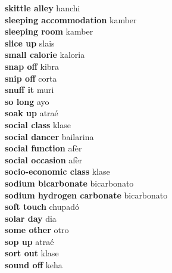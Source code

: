 \textbf{ skittle alley  } hanchi \\
\textbf{ sleeping accommodation  } kamber \\
\textbf{ sleeping room  } kamber \\
\textbf{ slice up  } slais \\
\textbf{ small calorie  } kaloria \\
\textbf{ snap off  } kibra \\
\textbf{ snip off  } corta \\
\textbf{ snuff it  } muri \\
\textbf{ so long  } ayo \\
\textbf{ soak up  } atraé \\
\textbf{ social class  } klase \\
\textbf{ social dancer  } bailarina \\
\textbf{ social function  } afèr \\
\textbf{ social occasion  } afèr \\
\textbf{ socio-economic class  } klase \\
\textbf{ sodium bicarbonate  } bicarbonato \\
\textbf{ sodium hydrogen carbonate  } bicarbonato \\
\textbf{ soft touch  } chupadó \\
\textbf{ solar day  } dia \\
\textbf{ some other  } otro \\
\textbf{ sop up  } atraé \\
\textbf{ sort out  } klase \\
\textbf{ sound off  } keha \\
